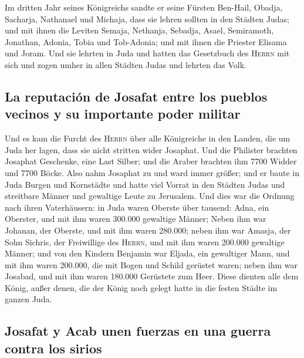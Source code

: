  Im dritten Jahr seines Königreichs sandte er seine
Fürsten Ben-Hail, Obadja, Sacharja, Nathanael und Michaja, dass sie
lehren sollten in den Städten Judas;  und mit ihnen die
Leviten Semaja, Nethanja, Sebadja, Asael, Semiramoth, Jonathan, Adonia,
Tobia und Tob-Adonia; und mit ihnen die Priester Elisama und Joram.
 Und sie lehrten in Juda und hatten das Gesetzbuch des
\textsc{Herrn} mit sich und zogen umher in allen Städten Judas und
lehrten das Volk.

\hypertarget{la-reputaciuxf3n-de-josafat-entre-los-pueblos-vecinos-y-su-importante-poder-militar}{%
\subsection{La reputación de Josafat entre los pueblos vecinos y su
importante poder
militar}\label{la-reputaciuxf3n-de-josafat-entre-los-pueblos-vecinos-y-su-importante-poder-militar}}

 Und es kam die Furcht des \textsc{Herrn} über alle
Königreiche in den Landen, die um Juda her lagen, dass sie nicht
stritten wider Josaphat.  Und die Philister brachten
Josaphat Geschenke, eine Last Silber; und die Araber brachten ihm 7700
Widder und 7700 Böcke.  Also nahm Josaphat zu und ward
immer größer; und er baute in Juda Burgen und Kornstädte 
und hatte viel Vorrat in den Städten Judas und streitbare Männer und
gewaltige Leute zu Jerusalem.  Und dies war die Ordnung
nach ihren Vaterhäusern: in Juda waren Oberste über tausend: Adna, ein
Oberster, und mit ihm waren 300.000 gewaltige Männer; 
Neben ihm war Johanan, der Oberste, und mit ihm waren 280.000;
 neben ihm war Amasja, der Sohn Sichris, der Freiwillige
des \textsc{Herrn}, und mit ihm waren 200.000 gewaltige Männer;
 und von den Kindern Benjamin war Eljada, ein gewaltiger
Mann, und mit ihm waren 200.000, die mit Bogen und Schild gerüstet
waren;  neben ihm war Josabad, und mit ihm waren 180.000
Gerüstete zum Heer.  Diese dienten alle dem König, außer
denen, die der König noch gelegt hatte in die festen Städte im ganzen
Juda.

\hypertarget{josafat-y-acab-unen-fuerzas-en-una-guerra-contra-los-sirios}{%
\subsection{Josafat y Acab unen fuerzas en una guerra contra los
sirios}\label{josafat-y-acab-unen-fuerzas-en-una-guerra-contra-los-sirios}}

